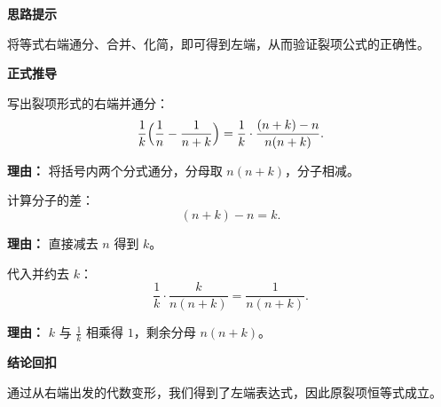 \begin{proofbox}
	\textbf{\textcolor{CProof}{思路提示}}

	将等式右端通分、合并、化简，即可得到左端，从而验证裂项公式的正确性。

	\medskip
	\textbf{\textcolor{CProof}{正式推导}}
	\begin{description}[style=nextline, leftmargin=2.8em, labelsep=0.5em, itemsep=0.55em]
		\item[\textbf{步骤一（通分合并）：}] 写出裂项形式的右端并通分：
			\[
				\frac{1}{k}\Bigl(\frac{1}{n} - \frac{1}{n+k}\Bigr)
				= \frac{1}{k}\cdot\frac{(n+k) - n}{n(n+k)}.
			\]
			\par\textbf{理由：} 将括号内两个分式通分，分母取 $n(n+k)$，分子相减。

		\item[\textbf{步骤二（分子化简）：}] 计算分子的差：
			\[
				(n+k) - n = k.
			\]
			\par\textbf{理由：} 直接减去 $n$ 得到 $k$。

		\item[\textbf{步骤三（约分消元）：}] 代入并约去 $k$：
			\[
				\frac{1}{k}\cdot\frac{k}{n(n+k)} = \frac{1}{n(n+k)}.
			\]
			\par\textbf{理由：} $k$ 与 $\frac{1}{k}$ 相乘得 $1$，剩余分母 $n(n+k)$。
	\end{description}

	\medskip
	\textbf{\textcolor{CProof}{结论回扣}}

	通过从右端出发的代数变形，我们得到了左端表达式，因此原裂项恒等式成立。
\end{proofbox}
